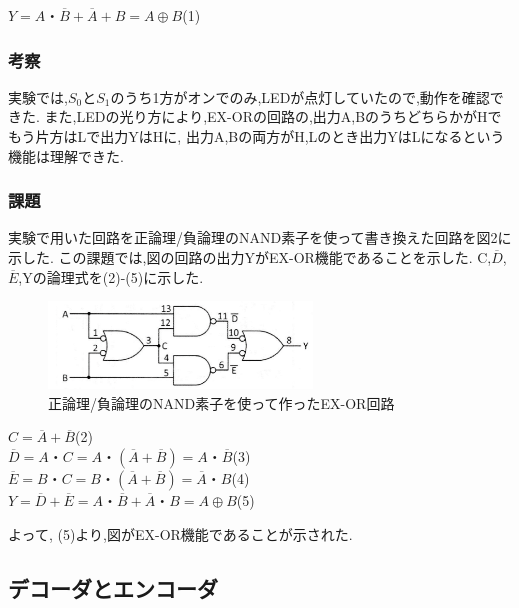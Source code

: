 \documentclass[twocolumn, 10pt,a4j]{jsarticle}
\begin{document}
    \begin{center}
      $Y = A・\overline{B} + \overline{A} + B = A \oplus B$\quad(1)
    \end{center}
  \subsubsection{考察}
   実験では,$S_{0}$と$S_{1}$のうち1方がオンでのみ,LEDが点灯していたので,動作を確認できた.
   また,LEDの光り方により,EX-ORの回路の,出力A,BのうちどちらかがHでもう片方はLで出力YはHに,
   出力A,Bの両方がH,Lのとき出力YはLになるという機能は理解できた.
  \subsubsection{課題}
    実験で用いた回路を正論理/負論理のNAND素子を使って書き換えた回路を図2に示した.
    この課題では,図の回路の出力YがEX-OR機能であることを示した.
    C,$\overline{D}$,$\overline{E}$,Yの論理式を(2)-(5)に示した.
    \begin{figure}[H]
      \begin{center}
        \includegraphics[width=7cm]{../img/ex_or/nand_ex_or_kairo.png}
        \caption{正論理/負論理のNAND素子を使って作ったEX-OR回路}
      \end{center}
    \end{figure}
    \begin{center}
        $C = \overline{A} + \overline{B}$\quad(2) \\
        $\overline{D} = A・C = A・(\overline{A} + \overline{B}) = A・\overline{B}$\quad(3) \\
        $\overline{E} = B・C = B・(\overline{A} + \overline{B}) = \overline{A}・B$\quad(4) \\
        $Y = \overline{D}+\overline{E}=A・\overline{B}+\overline{A}・B=A \oplus B$\quad(5) \\
    \end{center}
    よって, (5)より,図がEX-OR機能であることが示された.
\subsection{デコーダとエンコーダ}
\end{document}
